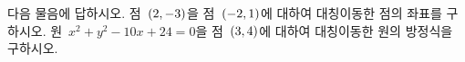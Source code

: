 다음 물음에 답하시오.
 점~$(2{,}\mkern3mu\mathopen{}-3)$을 점~$(-2{,}\mkern3mu\mathopen{}1)$에 대하여 대칭이동한 점의 좌표를 구하시오.
 원~$x^2+y^2-10x+24=0$을 점~$(3{,}\mkern3mu\mathopen{}4)$에 대하여 대칭이동한 원의 방정식을 구하시오.
